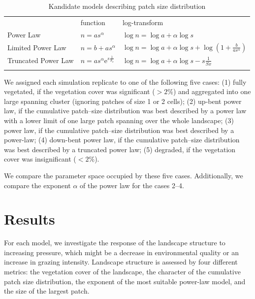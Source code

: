 \begin{table}[t!]
\label{tab:fitmodels}
\caption{ Kandidate models describing patch size distribution }
\centering
\begin{tabular}{lll}

\toprule
 & function & log-transform \\ \cmidrule(rl){2-2} \cmidrule(rl){3-3}
Power Law &  $n = a s^{ \alpha}$ & $ \log{n} =\log{a} + \alpha \log s$\\
Limited Power Law &  $n = b + a s^{ \alpha} $ & $ \log{n} = \log a + \alpha \log{s} + \log(1+\frac{b}{a s^{\alpha} })$\\
Truncated Power Law & $n = a s^{ \alpha} \mathrm{e}^{s \frac{1}{S_x}}$  & $\log{n} = \log a  + \alpha  \log s  - s \frac{1}{Sx}  $ \\
	\bottomrule
\multicolumn{3}{p{12.5cm}}{\footnotesize  }
	\end{tabular}
\end{table}


We assigned each simulation replicate to one of the following five cases: (1) fully vegetated, if the vegetation cover was significant ($ > 2 \%$) and aggregated into one large spanning cluster (ignoring patches of size 1 or 2 cells); (2) up-bent power law, if the cumulative patch--size distribution was best described by a power law with a lower limit of one large patch spanning over the whole landscape; (3) power law, if the cumulative patch--size distribution  was best described by a power-law; (4) down-bent power law, if the cumulative patch--size distribution was best described by a truncated power law; (5) degraded, if the vegetation cover was insignificant ($< 2\%$).

We compare the parameter space occupied by these five cases. Additionally, we compare the exponent $\alpha$ of the power law for the cases 2--4. 

\section{Results}

For each model, we investigate the response of the landscape structure to increasing pressure, which might be a decrease in environmental quality or an increase in grazing intensity. Landscape structure is assessed by four different metrics: the vegetation cover of the landscape, the character of the cumulative patch size distribution, the exponent of the most suitable power-law model, and the size of the largest patch. 

